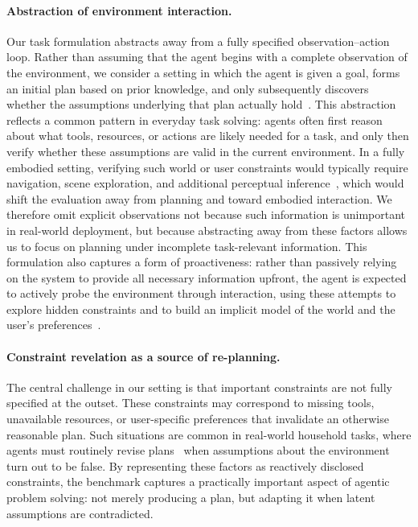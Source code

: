\documentclass{llmxive}
\begin{document}
\paragraph{Abstraction of environment interaction.}
Our task formulation abstracts away from a fully specified observation--action loop. Rather than assuming that the agent begins with a complete observation of the environment, we consider a setting in which the agent is given a goal, forms an initial plan based on prior knowledge, and only subsequently discovers whether the assumptions underlying that plan actually hold~\citep{HANHEIDE2017119,pmlr-v87-nyga18a}. 
This abstraction reflects a common pattern in everyday task solving: agents often first reason about what tools, resources, or actions are likely needed for a task, and only then verify whether these assumptions are valid in the current environment. In a fully embodied setting, verifying such world or user constraints would typically require navigation, scene exploration, and additional perceptual inference~\citep{shridhar2020alfredbenchmarkinterpretinggrounded,kim2024realfredembodiedinstructionfollowing,liu2026naacl}, which would shift the evaluation away from planning and toward embodied interaction. We therefore omit explicit observations not because such information is unimportant in real-world deployment, but because abstracting away from these factors allows us to focus on planning under incomplete task-relevant information. This formulation also captures a form of proactiveness: rather than passively relying on the system to provide all necessary information upfront, the agent is expected to actively probe the environment through interaction, using these attempts to explore hidden constraints and to build an implicit model of the world and the user's preferences~\citep{narcomey2024learninghumanpreferencesrobot,sadigh2016information}.

\paragraph{Constraint revelation as a source of re-planning.}
The central challenge in our setting is that important constraints are not fully specified at the outset. 
These constraints may correspond to missing tools, unavailable resources, or user-specific preferences that invalidate an otherwise reasonable plan. 
Such situations are common in real-world household tasks, where agents must routinely revise plans~\citep{costbench} when assumptions about the environment turn out to be false. By representing these factors as reactively disclosed constraints, the benchmark captures a practically important aspect of agentic problem solving: not merely producing a plan, but adapting it when latent assumptions are contradicted.
\end{document}
